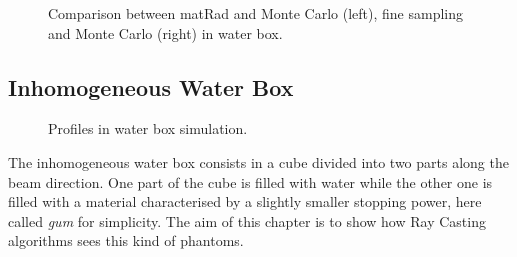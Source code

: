 \documentclass[12pt, a4paper, twoside]{book}
\begin{document}
\begin{figure}[!ht]
\centering
{} 
\caption{Comparison between matRad and Monte Carlo (left), fine sampling and Monte Carlo (right) in water box.}
\label{fig:WB3gam}
\end{figure}


\subsection{Inhomogeneous Water Box}\label{inhomo}

\begin{figure}[!b]
\centering
{}\quad
{}\quad
{}\quad
\caption{Profiles in water box simulation.}
\label{fig:IP}
\end{figure}

The inhomogeneous water box consists in a cube divided into two parts along the beam direction. One part of the cube is filled with water while the other one is filled with a material characterised by a slightly smaller stopping power, here called \emph{gum} for simplicity. The aim of this chapter is to show how Ray Casting algorithms sees this kind of phantoms.
\end{document}
